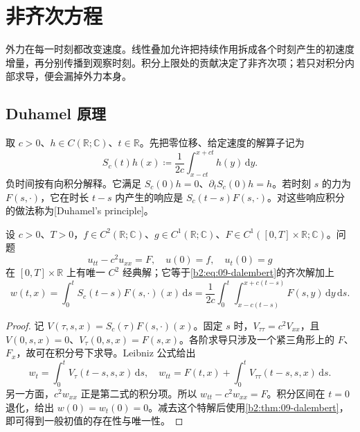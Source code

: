 \section{非齐次方程}
\label{b2:sec:0902}

外力在每一时刻都改变速度。线性叠加允许把持续作用拆成各个时刻产生的初速度增量，再分别传播到观察时刻。积分上限处的贡献决定了非齐次项；若只对积分内部求导，便会漏掉外力本身。

\subsection{Duhamel 原理}
\label{b2:subsec:090201}

取 \(c>0\)、\(h\in C(\mathbb R;\mathbb C)\)、\(t\in\mathbb R\)。先把零位移、给定速度的解算子记为
\[
 S_c(t)h(x)\coloneqq\dfrac1{2c}\int_{x-ct}^{x+ct}h(y)\,\mathrm{d}y.
\]
负时间按有向积分解释。它满足 \(S_c(0)h=0\)、\(\partial_tS_c(0)h=h\)。若时刻 \(s\) 的力为 \(F(s,\cdot)\)，它在时长 \(t-s\) 内产生的响应是 \(S_c(t-s)F(s,\cdot)\)。对这些响应积分的做法称为[Duhamel's principle]。

\begin{theorem}\label{b2:thm:09-duhamel}
设 \(c>0\)、\(T>0\)，\(f\in C^2(\mathbb R;\mathbb C)\)、\(g\in C^1(\mathbb R;\mathbb C)\)、\(F\in C^1([0,T]\times\mathbb R;\mathbb C)\)。问题
\[
 u_{tt}-c^2u_{xx}=F,\quad u(0)=f,\quad u_t(0)=g
\]
在 \([0,T]\times\mathbb R\) 上有唯一 \(C^2\) 经典解；它等于\eqref{b2:eq:09-dalembert}的齐次解加上
\begin{equation}\label{b2:eq:09-duhamel}
 w(t,x)=\int_0^tS_c(t-s)F(s,\cdot)(x)\,\mathrm{d}s
 =\dfrac1{2c}\int_0^t\int_{x-c(t-s)}^{x+c(t-s)}F(s,y)\,\mathrm{d}y\,\mathrm{d}s.
\end{equation}
\end{theorem}
\begin{proof}
记 \(V(\tau,s,x)=S_c(\tau)F(s,\cdot)(x)\)。固定 \(s\) 时，\(V_{\tau\tau}=c^2V_{xx}\)，且 \(V(0,s,x)=0\)、\(V_\tau(0,s,x)=F(s,x)\)。各阶求导只涉及一个紧三角形上的 \(F\)、\(F_x\)，故可在积分号下求导。Leibniz 公式给出
\[
 w_t=\int_0^tV_\tau(t-s,s,x)\,\mathrm{d}s,\quad
 w_{tt}=F(t,x)+\int_0^tV_{\tau\tau}(t-s,s,x)\,\mathrm{d}s.
\]
另一方面，\(c^2w_{xx}\) 正是第二式的积分项。所以 \(w_{tt}-c^2w_{xx}=F\)。积分区间在 \(t=0\) 退化，给出 \(w(0)=w_t(0)=0\)。减去这个特解后使用\cref{b2:thm:09-dalembert}，即可得到一般初值的存在性与唯一性。
\end{proof}

